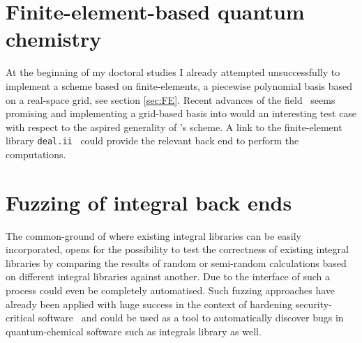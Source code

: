 \section{Finite-element-based quantum chemistry}
At the beginning of my doctoral studies I already attempted
unsuccessfully to implement a \HF scheme based on finite-elements,
a piecewise polynomial basis based on a real-space grid,
see section \vref{sec:FE}.
Recent advances of the field~\cite{Frediani2015,Toivanen2015,Davydov2015,Boffi2016}
seems promising and
implementing a grid-based basis into \molsturm
would an interesting test case with respect to the aspired generality
of \molsturm's \SCF scheme.
A link to the finite-element library \texttt{deal.ii}~\cite{Arndt2017}
could provide the relevant back end to perform the computations.


\section{Fuzzing of integral back ends}
The common-ground \SCF of \molsturm where existing integral libraries
can be easily incorporated,
opens for the possibility to test the correctness
of existing integral libraries by comparing the results of
random or semi-random \SCF calculations based on different integral libraries
against another.
Due to the \python interface of \molsturm such a process could
even be completely automatised.
Such fuzzing approaches have already been applied with huge success
in the context of hardening security-critical software~\cite{Fuzzing}
and could be used as a tool to automatically discover bugs
in quantum-chemical software such as integrals library as well.
